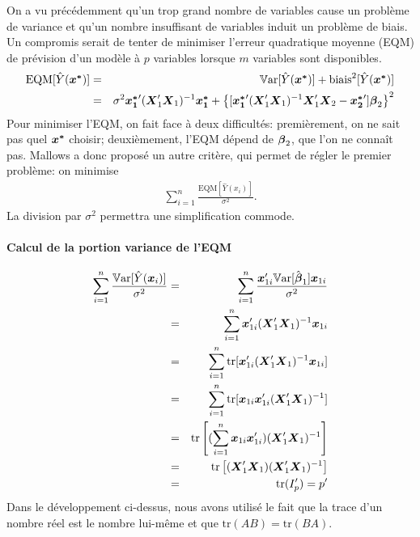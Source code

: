 On a vu précédemment qu'un trop grand nombre de variables cause un problème de variance et qu'un nombre insuffisant de variables induit un problème de biais. Un compromis serait de tenter de minimiser l'erreur quadratique moyenne (EQM) de prévision d'un modèle à $p$ variables lorsque $m$ variables sont disponibles.
\begin{eqnarray*}
  \mbox{EQM}[\hat{Y}(\bo{x^*})] &=& \var[\hat{Y}(\bo{x^*})] + \mbox{biais}^2[\hat{Y}(\bo{x^*})] \\
  &=& \sigma^2\bo{x_1^*}'(\boX_1'\boX_1)^{-1}\bo{x_1^*} + \left\{[{\bo{x_1^*}'(\boX_1'\boX_1)^{-1}\boX_1' \boX_2}-\bo{x_2^*}']\bobeta_2\right\}^2
\end{eqnarray*}
Pour minimiser l'EQM, on fait face à deux difficultés: premièrement,  on ne sait pas quel $\bo{x^*}$ choisir; deuxièmement, l'EQM dépend de $\bobeta_2$, que l'on ne connaît pas. Mallows a donc proposé un autre critère, qui permet de régler le premier problème: on minimise
\begin{eqnarray*}
  \sum_{i=1}^n \frac{\text{EQM}[\hat{Y}(x_i)]}{\sigma^2}.
\end{eqnarray*}
La division par $\sigma^2$ %
permettra une simplification commode.

\paragraph{Calcul de la portion variance de l'EQM}
\begin{eqnarray*}
  \sum_{i=1}^n \frac{\var[\hat{Y}(\bo{x}_i)]}{\sigma^2} &=& \sum_{i=1}^n \frac{\bo{x}_{1i}' \var[\hbobeta_1] \bo{x}_{1i}}{\sigma^2} \\
  &=& \sum_{i=1}^n \bo{x}_{1i}' (\boX_1' \boX_1)^{-1} \bo{x}_{1i} \\
  &=& \sum_{i=1}^n \mbox{tr}[\bo{x}_{1i}' (\boX_1'\boX_1)^{-1} \bo{x}_{1i}]  \\
  &=& \sum_{i=1}^n \mbox{tr}[\bo{x}_{1i} \bo{x}_{1i}' (\boX_1'\boX_1)^{-1}] \\
  &=& \mbox{tr}\left[(\sum_{i=1}^n \bo{x}_{1i}\bo{x}_{1i}') (\boX_1' \boX_1)^{-1}\right] \\
  &=& \mbox{tr}\left[(\boX_1'\boX_1)(\boX_1'\boX_1)^{-1}\right] \\
  &=& \mbox{tr}(I_p')=p'
\end{eqnarray*}
Dans le développement ci-dessus, nous avons utilisé le fait que la trace d'un nombre réel est le nombre lui-même et que $\mbox{tr}(AB)=\mbox{tr}(BA).$


